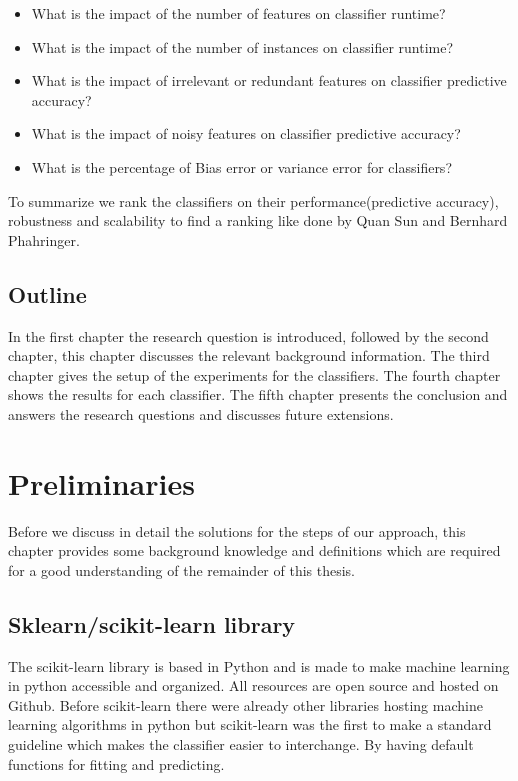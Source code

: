 \documentclass[a4paper,10pt]{article}
\begin{document}
\begin{itemize}
	\item What is the impact of the number of features on classifier runtime?
	\item What is the impact of the number of instances on classifier runtime?
	\item What is the impact of irrelevant or redundant features on classifier predictive accuracy?
	\item What is the impact of noisy features on classifier predictive accuracy?
	\item What is the percentage of Bias error or variance error for classifiers?
\end{itemize}

To summarize we rank the classifiers on their performance(predictive accuracy), robustness and scalability to find a ranking like done by Quan Sun and Bernhard Phahringer\cite{ranking}.




\subsection{Outline}
In the first chapter the research question is introduced, followed by the second chapter, this chapter discusses the relevant background information. The third chapter gives the setup of the experiments for the classifiers. The fourth chapter shows the results for each classifier. The fifth chapter presents the conclusion and answers the research questions and discusses future extensions.

\newpage


\section{Preliminaries} \label{Chapter2}
Before we discuss in detail the solutions for the steps of our approach, this chapter provides
some background knowledge and definitions which are required for a good understanding of
the remainder of this thesis.
\subsection{Sklearn/scikit-learn library}
The scikit-learn library is based in Python and is made to make machine learning in python accessible and organized. 
All resources are open source and hosted on Github. Before scikit-learn there were already other libraries hosting machine learning algorithms in python but scikit-learn was the first to make a standard guideline which makes the classifier easier to interchange. By having default functions for fitting and predicting.
\end{document}
